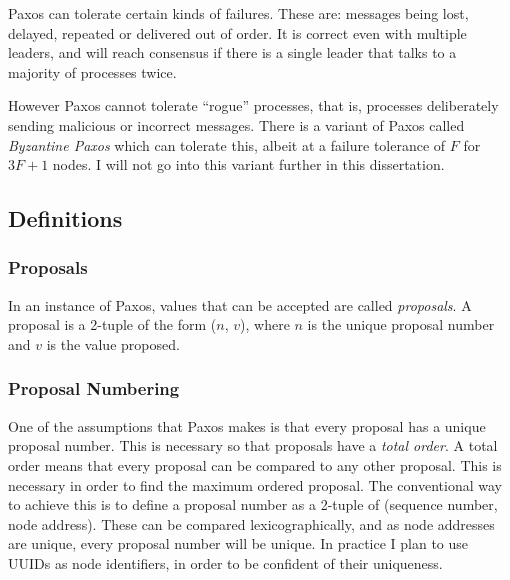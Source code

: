 \documentclass[12pt,twoside,notitlepage]{report}
\begin{document}
Paxos can tolerate certain kinds of failures. These are: messages being lost, delayed, repeated or
delivered out of order. It is correct even with multiple leaders, and will reach consensus if
there is a single leader that talks to a majority of processes twice.

%

However Paxos cannot tolerate ``rogue'' processes, that is, processes deliberately sending
malicious or incorrect messages. There is a variant of Paxos called \emph{Byzantine Paxos} which
can tolerate this, albeit at a failure tolerance of $F$ for $3F + 1$ nodes. I will not go into
this variant further in this dissertation.

\subsection{Definitions}

\subsubsection*{Proposals}

In an instance of Paxos, values that can be accepted are called \emph{proposals}. A proposal is a
2-tuple of the form ($n$, $v$), where $n$ is the unique proposal number and $v$ is the value
proposed.

\subsubsection*{Proposal Numbering}

One of the assumptions that Paxos makes is that every proposal has a unique proposal number. This
is necessary so that proposals have a \emph{total order}. A total order means that every proposal
can be compared to any other proposal. This is necessary in order to
find the maximum ordered proposal. The conventional way to achieve this is to define a proposal
number as a 2-tuple of (sequence number, node address). These can be compared lexicographically,
and as node addresses are unique, every proposal number will be unique. In practice I plan to use
UUIDs as node identifiers, in order to be confident of their uniqueness.
\end{document}
